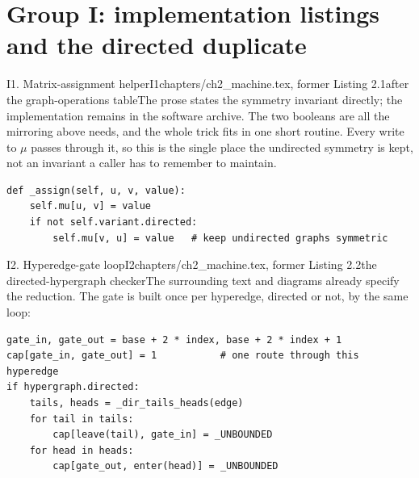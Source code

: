 \section*{Group I: implementation listings and the directed duplicate}

\begin{offcut}{I1. Matrix-assignment helper}{I1}{chapters/ch2\_machine.tex, former Listing 2.1}{after the graph-operations table}{The prose states the symmetry invariant directly; the implementation remains in the software archive.}
The two booleans are all the mirroring above needs, and the whole trick fits in one short routine. Every write to $\mu$ passes through it, so this is the single place the undirected symmetry is kept, not an invariant a caller has to remember to maintain.

\begin{lstlisting}[caption={How every write keeps an undirected graph symmetric. A directed graph simply skips the mirrored write.}, label={offcut:lst:assign}]
def _assign(self, u, v, value):
    self.mu[u, v] = value
    if not self.variant.directed:
        self.mu[v, u] = value   # keep undirected graphs symmetric
\end{lstlisting}
\end{offcut}

\begin{offcut}{I2. Hyperedge-gate loop}{I2}{chapters/ch2\_machine.tex, former Listing 2.2}{the directed-hypergraph checker}{The surrounding text and diagrams already specify the reduction.}
The gate is built once per hyperedge, directed or not, by the same loop:

\begin{lstlisting}[caption={The gate loop behind \Cref{fig:hyper-gadget} and \Cref{fig:dir-hyper-gadget}: one capacity-one gate per hyperedge, wired one-way for a directed hyperedge and both ways for an undirected one.}, label={offcut:i:lst:gate}]
gate_in, gate_out = base + 2 * index, base + 2 * index + 1
cap[gate_in, gate_out] = 1           # one route through this hyperedge
if hypergraph.directed:
    tails, heads = _dir_tails_heads(edge)
    for tail in tails:
        cap[leave(tail), gate_in] = _UNBOUNDED
    for head in heads:
        cap[gate_out, enter(head)] = _UNBOUNDED
\end{lstlisting}
\end{offcut}

